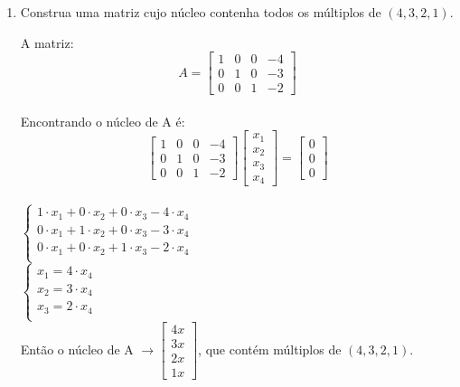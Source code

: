 \documentclass[leqno]{article}
\numberwithin{equation}{section}
\begin{document}
\begin{enumerate}
		\item Construa uma matriz cujo núcleo contenha todos os múltiplos de $(4,3,2,1)$.
		
		\begin{sol} 
			A matriz:  $$A = \begin{bmatrix} 
				1 & 0 & 0 & -4\\
				0 & 1 & 0 & -3\\
				0 & 0 & 1 & -2
			\end{bmatrix} $$\\
		Encontrando o núcleo de A é:
		$$\begin{bmatrix} 
			1 & 0 & 0 & -4\\
			0 & 1 & 0 & -3\\
			0 & 0 & 1 & -2
		\end{bmatrix} \begin{bmatrix} 
		x_1 \\
		x_2 \\
		x_3 \\
		x_4 \end{bmatrix} =
		\begin{bmatrix} 
			0 \\
			0 \\
			0\end{bmatrix}$$\\
		\newline
		$
		\left\{
		\begin {array}{cl}
		1 \cdot x_1 + 0 \cdot x_2 + 0 \cdot x_3  - 4 \cdot x_4 \\
		0 \cdot x_1 + 1 \cdot x_2 + 0 \cdot x_3 - 3 \cdot x_4 \\
		0 \cdot x_1 + 0 \cdot x_2 + 1 \cdot x_3 - 2 \cdot x_4 \\
		\end{array}
		\right.$\\
		\newline
		$
		\left\{
		\begin {array}{cl}
		x_1 = 4 \cdot x_4\\
		x_2 = 3 \cdot x_4\\
		x_3 = 2 \cdot x_4\\
		\end{array}
		\right.$\\
		Então o núcleo de A $\rightarrow \begin{bmatrix} 
			4x \\
			3x \\
			2x \\
			1x \end{bmatrix}$, que contém múltiplos de $(4,3,2,1)$.
		\end{sol} 
		

\end{enumerate}
\end{document}
